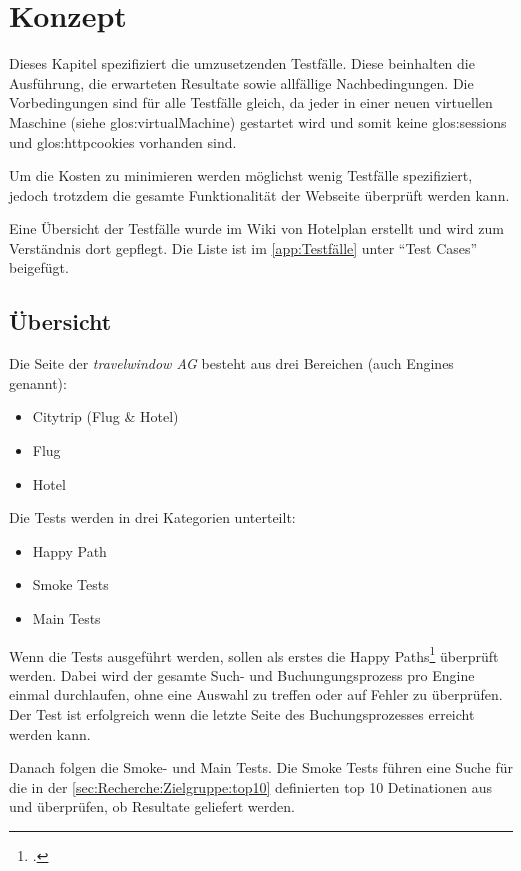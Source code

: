 
\chapter{Konzept}
\label{sec:konzept}
Dieses Kapitel spezifiziert die umzusetzenden Testfälle. Diese beinhalten die Ausführung, die erwarteten Resultate sowie allfällige Nachbedingungen. Die Vorbedingungen sind für alle Testfälle gleich, da jeder in einer neuen virtuellen Maschine (siehe \Gls{glos:virtualMachine}) gestartet wird und somit keine \Glspl{glos:session} und \Glspl{glos:httpcookie} vorhanden sind.

Um die Kosten zu minimieren werden möglichst wenig Testfälle spezifiziert, jedoch trotzdem die gesamte Funktionalität der Webseite überprüft werden kann.

Eine Übersicht der Testfälle wurde im Wiki von Hotelplan erstellt und wird zum Verständnis dort gepflegt. Die Liste ist im \cref{app:Testfälle}  unter "`Test Cases"' beigefügt.

\section{Übersicht}
Die Seite der \textit{travelwindow AG} besteht aus drei Bereichen (auch Engines genannt):
\begin{itemize}
\item Citytrip (Flug \& Hotel)
\item Flug
\item Hotel
\end{itemize}

Die Tests werden in drei Kategorien unterteilt:
\begin{itemize}
\item Happy Path
\item Smoke Tests
\item Main Tests
\end{itemize}

Wenn die Tests ausgeführt werden, sollen als erstes die Happy Paths\footcite{Happy_path_-_Wikipedia_the_free_encyclopedia_2015-07-30} überprüft werden. Dabei wird der gesamte Such- und Buchungungsprozess pro Engine einmal durchlaufen, ohne eine Auswahl zu treffen oder auf Fehler zu überprüfen. Der Test ist erfolgreich wenn die letzte Seite des Buchungsprozesses erreicht werden kann.

Danach folgen die Smoke- und Main Tests. Die Smoke Tests führen eine Suche für die in der \cref{sec:Recherche:Zielgruppe:top10}  definierten top 10 Detinationen aus und überprüfen, ob Resultate geliefert werden.

